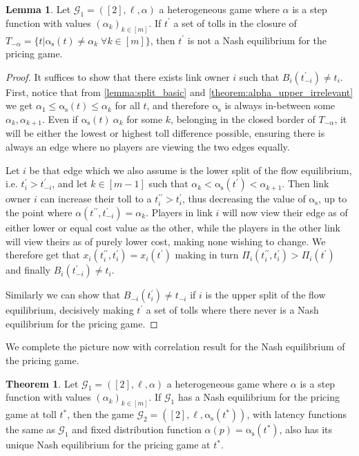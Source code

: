 \documentclass[10pt,a4paper]{book}
\newcommand{\as}{\mathrm{\alpha_s}}
\newcommand{\Gm}{\mathcal{G}}
\theoremstyle{definition}
\newtheorem{theorem}[definition]{Theorem}
\newtheorem{lemma}[definition]{Lemma}
\theoremstyle{comment}
\begin{document}
\begin{lemma}
	\label{lemma:a_step_gaps}
	Let $\Gm_1 = ([2], \ell, \alpha)$ a heterogeneous game where $\alpha$ is a step function with values $(\alpha_k)_{k \in [m]}$.
	If $t^\prime$ a set of tolls in the closure of $T_{-\alpha} = \{t | \as(t) \ne \alpha_k \; \forall k \in [m]\}$, then $t^\prime$ is not a Nash equilibrium for the pricing game.
\end{lemma}

\begin{proof}
	It suffices to show that there exists link owner $i$ such that $B_i(t_{-i}^\prime) \ne t_i$.
	First, notice that from \ref{lemma:split_basic} and \ref{theorem:alpha_upper_irrelevant} we get $\alpha_1 \le \as(t) \le \alpha_k$ for all $t$, and therefore $\as$ is always in-between some $\alpha_k, \alpha_{k+1}$.
	Even if $\as(t) \ \alpha_k$ for some $k$, belonging in the closed border of $T_{-\alpha}$, it will be either the lowest or highest toll difference possible, ensuring there is always an edge where no players are viewing the two edges equally.

	Let $i$ be that edge which we also assume is the lower split of the flow equilibrium, i.e. $t_i^\prime > t_{-i}^\prime$, and let $k \in [m - 1]$ such that $\alpha_k < \as(t^\prime) < \alpha_{k+1}$.
	Then link owner $i$ can increase their toll to a $t_i^{\prime\prime} > t_i^\prime$, thus decreasing the value of $\as$, up to the point where $\alpha(t^{\prime\prime}, t_{-i}^\prime) = \alpha_k$.
	Players in link $i$ will now view their edge as of either lower or equal cost value as the other, while the players in the other link will view theirs as of purely lower cost, making none wishing to change.
	We therefore get that $x_i(t_i^{\prime\prime}, t_i^\prime) = x_i(t^\prime)$ making in turn $\Pi_i(t_i^{\prime\prime}, t_i^\prime) > \Pi_i(t^\prime)$ and finally $B_i(t_{-i}^\prime) \ne t_i$.

	Similarly we can show that $B_{-i}(t_i^\prime) \ne t_{-i}$ if $i$ is the upper split of the flow equilibrium, decisively making $t^\prime$ a set of tolls where there never is a Nash equilibrium for the pricing game.
\end{proof}

We complete the picture now with correlation result for the Nash equilibrium of the pricing game.

\begin{theorem}
	\label{theorem:a_step_ne_equiv_fixed}
	Let $\Gm_1 = ([2], \ell, \alpha)$ a heterogeneous game where $\alpha$ is a step function with values $(\alpha_k)_{k \in [m]}$.
	If $\Gm_1$ has a Nash equilibrium for the pricing game at toll $t^*$, then the game $\Gm_2 = ([2], \ell, \as(t^*))$, with latency functions the same as $\Gm_1$ and fixed distribution function $\alpha(p) = \as(t^*)$, also has its unique Nash equilibrium for the pricing game at $t^*$.
\end{theorem}
\end{document}
